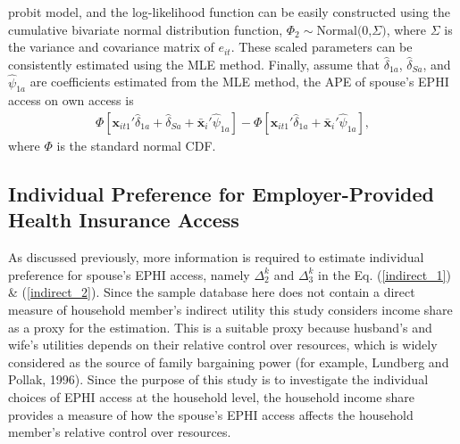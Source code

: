 \documentclass[legno,11pt]{article}
\begin{document}
probit model, and the log-likelihood function can be easily
constructed using the cumulative bivariate normal distribution
function, $\Phi_{2}\sim\text{Normal(0,$\Sigma$)}$, where $\Sigma$ is
the variance and covariance matrix of $e_{it}$. These scaled
parameters can be consistently estimated using the MLE method.
Finally, assume that $\hat{\delta}_{1a}$, $\hat{\delta}_{Sa}$, and
$\hat{\psi}_{1a}$ are coefficients estimated from the MLE method,
the APE of spouse's EPHI access on own access is
\begin{align}
\Phi[\textbf{x}_{it1}'\hat{\delta}_{1a}+\hat{\delta}_{Sa}+\bar{\textbf{x}}_{i}'\hat{\psi}_{1a}]-\Phi[\textbf{x}_{it1}'\hat{\delta}_{1a}+\bar{\textbf{x}}_{i}'\hat{\psi}_{1a}],
\end{align}
where $\Phi$ is the standard normal CDF.

\subsection{Individual Preference for Employer-Provided Health Insurance Access}\label{section4_2}
As discussed previously, more information is required to estimate
individual preference for spouse's EPHI access, namely
$\Delta_{2}^{k}$ and $\Delta_{3}^{k}$ in the  Eq. (\ref{indirect_1})
\& (\ref{indirect_2}). Since the sample database here does not
contain a direct measure of household member's indirect utility this
study considers income share as a proxy for the estimation. This is
a suitable proxy because husband's and wife's utilities depends on
their relative control over resources, which is widely considered as
the source of family bargaining power (for example, Lundberg and
Pollak, 1996). Since the purpose of this study is to investigate the
individual choices of EPHI access at the household level, the
household income share provides a measure of how the spouse's EPHI
access affects the household member's relative control over
resources.
\par
\end{document}

